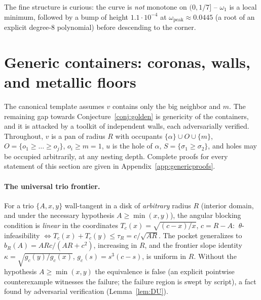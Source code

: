 \documentclass[11pt]{article}
\theoremstyle{definition}
\begin{document}
The fine structure is curious: the curve is \emph{not} monotone on
$(0,1/7]$ -- $\omega_1$ is a local minimum, followed by a bump of height
$1.1\cdot10^{-4}$ at $\omega_{\mathrm{peak}}\approx0.0445$ (a root of an
explicit degree-8 polynomial) before descending to the corner.

\section{Generic containers: coronas, walls, and metallic floors}
\label{sec:generic}

The canonical template assumes $v$ contains only the big neighbor and $m$.
The remaining gap towards Conjecture~\ref{conj:golden} is genericity of the
containers, and it is attacked by a toolkit of independent walls, each
adversarially verified. Throughout, $v$ is a pan of radius $R$ with occupants
$\{\alpha\}\cup O\cup\{m\}$, $O=\{o_1\ge\dots\ge o_j\}$, $o_i\ge m=1$,
$u$ is the hole of $\alpha$, $S=\{\sigma_1\ge\sigma_2\}$, and holes may be
occupied arbitrarily, at any nesting depth. Complete proofs for every
statement of this section are given in Appendix~\ref{app:genericproofs}.

\paragraph{The universal trio frontier.}
For a trio $\{A,x,y\}$ wall-tangent in a disk of \emph{arbitrary} radius $R$
(interior domain, and under the necessary hypothesis $A\ge\min(x,y)$), the
angular blocking condition is \emph{linear} in the coordinates
$T_c(x)=\sqrt{(c-x)/x}$, $c=R-A$:
$\ \theta$-infeasibility $\iff T_c(x)+T_c(y)\le\tau_R=c/\sqrt{AR}$.
The pocket generalizes to $b_R(A)=ARc/(AR+c^2)$, increasing in $R$, and the
frontier slope identity $\kappa=\sqrt{g_c(y)/g_c(x)}$, $g_c(s)=s^3(c-s)$, is
uniform in $R$. Without the hypothesis $A\ge\min(x,y)$ the equivalence is
false (an explicit pointwise counterexample witnesses the failure; the
failure region is swept by script), a fact
found by adversarial verification (Lemma~\ref{lem:DU}).
\end{document}
